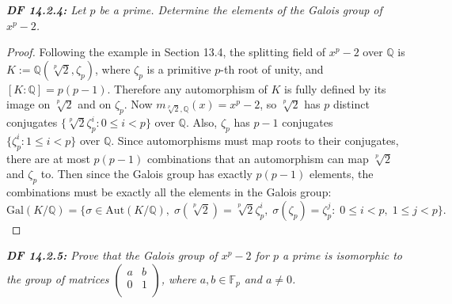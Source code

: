 \documentclass{article}
\begin{document}
\it \textbf{DF 14.2.4:} Let $p$ be a prime. Determine the elements of the
  Galois group of $x^p-2$.

  \begin{proof}
    Following the example in Section 13.4, the splitting field of $x^p-2$
    over $\mathbb{Q}$ is $K:=\mathbb{Q}(\sqrt[p]{2},\zeta_p)$, where
    $\zeta_p$ is a primitive $p$-th root of unity, and
    $[K:\mathbb{Q}]=p(p-1)$. Therefore any automorphism of $K$ is fully
    defined by its image on $\sqrt[p]{2}$ and on $\zeta_p$. Now
    $m_{\sqrt[p]{2},\mathbb{Q}}(x)=x^p-2$, so $\sqrt[p]{2}$ has $p$
    distinct conjugates $\{\sqrt[p]{2}\zeta^i_p:0\leq i<p\}$ over
    $\mathbb{Q}$. Also, $\zeta_p$ has $p-1$ conjugates $\{\zeta_p^i:1\leq
    i<p\}$ over $\mathbb{Q}$. Since automorphisms must map roots to their
    conjugates, there are at most $p(p-1)$ combinations that an
    automorphism can map $\sqrt[p]{2}$ and $\zeta_p$ to. Then since
    the Galois group has exactly $p(p-1)$ elements, the combinations must
    be exactly all the elements in the Galois group:
    \[\text{Gal}(K/\mathbb{Q}) =\{\sigma\in\text{Aut}(K/\mathbb{Q}),\;
    \sigma(\sqrt[p]{2})=\sqrt[p]{2}\zeta^i_p,\;
    \sigma(\zeta_p)=\zeta_p^j:\; 0\leq i<p,\; 1\leq j<p\}.\]
  \end{proof}

\it \textbf{DF 14.2.5:} Prove that the Galois group of $x^p-2$ for $p$ a
  prime is isomorphic to the group of matrices $\begin{pmatrix} a&b\\ 0&1\\
  \end{pmatrix}$, where $a,b\in\mathbb{F}_p$ and $a\neq0$.
\end{document}

